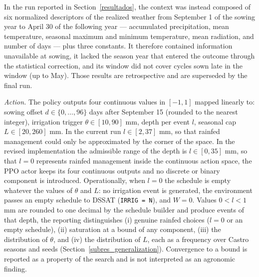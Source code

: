 \documentclass[times,final,authoryear]{elsarticle}
\begin{document}
In the run reported in Section~\ref{resultados}, the context was instead composed of six normalized descriptors of the realized weather from September 1 of the sowing year to April 30 of the following year --- accumulated precipitation, mean temperature, seasonal maximum and minimum temperature, mean radiation, and number of days --- plus three constants. It therefore contained information unavailable at sowing, it lacked the season year that entered the outcome through the statistical correction, and its window did not cover cycles sown late in the window (up to May). Those results are retrospective and are superseded by the final run.

\emph{Action.} The policy outputs four continuous values in $[-1,1]$ mapped linearly to: sowing offset $d \in \{0,\dots,96\}$ days after September 15 (rounded to the nearest integer), irrigation trigger $\theta \in [10, 90]$ mm, depth per event $l$, seasonal cap $L \in [20, 260]$ mm. In the current run $l \in [2, 37]$ mm, so that rainfed management could only be approximated by the corner of the space. In the revised implementation the admissible range of the depth is $l \in [0, 35]$ mm, so that $l = 0$ represents rainfed management inside the continuous action space, the PPO actor keeps its four continuous outputs and no discrete or binary component is introduced. Operationally, when $l = 0$ the schedule is empty whatever the values of $\theta$ and $L$: no irrigation event is generated, the environment passes an empty schedule to DSSAT (\texttt{IRRIG = N}), and $W = 0$. Values $0 < l < 1$ mm are rounded to one decimal by the schedule builder and produce events of that depth, the reporting distinguishes (i) genuine rainfed choices ($l = 0$ or an empty schedule), (ii) saturation at a bound of any component, (iii) the distribution of $\theta$, and (iv) the distribution of $L$, each as a frequency over Castro seasons and seeds (Section~\ref{subres_generalization}). Convergence to a bound is reported as a property of the search and is not interpreted as an agronomic finding.
\end{document}
